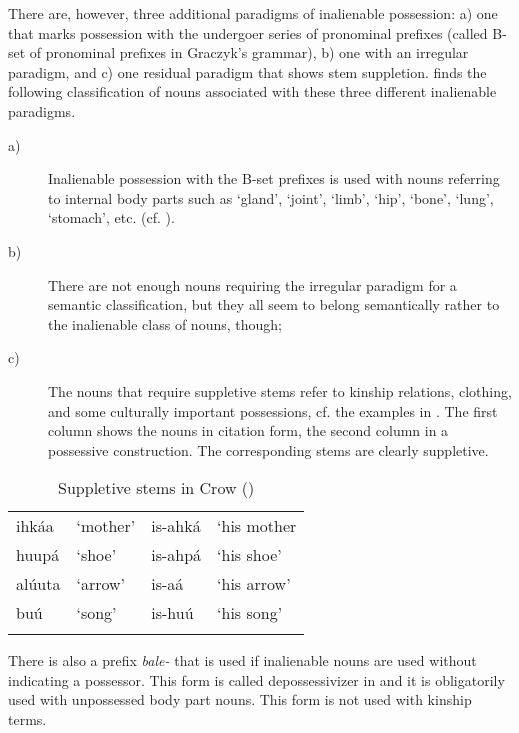 \documentclass[output=paper]{LSP/langsci}
\begin{document}
There are, however, three additional paradigms of inalienable possession: a) one that marks possession with the undergoer series of pronominal prefixes (called B-set of pronominal prefixes in Graczyk's grammar), b) one with an irregular paradigm, and c) one residual paradigm that shows stem suppletion. \citet[57]{Graczyk2007} finds the following classification of nouns associated with these three different inalienable paradigms.

\begin{description}
\item[a)] Inalienable possession with the B-set prefixes is used with nouns referring to internal body parts such as `gland', `joint', `limb', `hip', `bone', `lung', `stomach', etc. (cf. \citealt[57]{Graczyk2007}).

\item[b)] There are not enough nouns requiring the irregular paradigm for a semantic classification, but they all seem to belong semantically rather to the inalienable class of nouns, though;

\item[c)] The nouns that require suppletive stems refer to kinship relations, clothing, and some culturally important possessions, cf. the examples in . The first column shows the nouns in citation form, the second column in a possessive construction. The corresponding stems are clearly suppletive. 
\end{description}

\begin{table}
\caption{Suppletive stems in Crow (\citealt[58]{Graczyk2007})} \label{crowsuppletion}
\begin{tabular}[h]{ l l l l}
\lsptoprule
 ihkáa	 & `mother'	& is-ahká	& `his mother \\
 huupá & `shoe' &  is-ahpá	 &  `his shoe'\\
alúuta &  `arrow' & is-aá &  `his arrow'\\
buú & `song'	&  is-huú & `his song'\\
\lspbottomrule
\end{tabular}
\end{table}

There is also a prefix \textit{bale-} that is used if inalienable nouns are used without indicating a possessor. This form is called depossessivizer in \citet[53/234]{Graczyk2007} and it is obligatorily used with unpossessed body part nouns. This form is not used with kinship terms.
\end{document}
